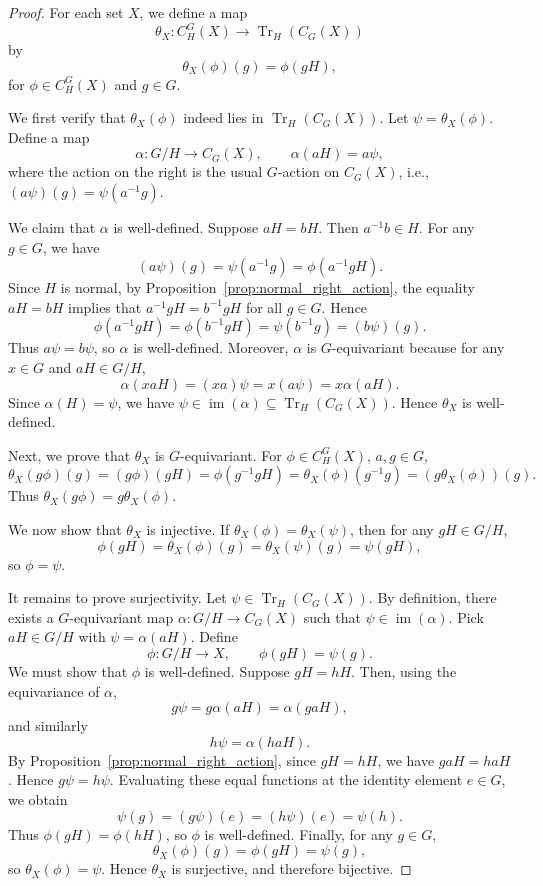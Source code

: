 \documentclass[10pt,a4paper]{amsart}
\begin{document}
\begin{proof}
For each set $X$, we define a map
\[
\theta_X \colon C_H^G(X) \longrightarrow \operatorname{Tr}_H(C_G(X))
\]
by
\[
\theta_X(\phi)(g) = \phi(gH),
\]
for $\phi \in C_H^G(X)$ and $g \in G$.

We first verify that $\theta_X(\phi)$ indeed lies in $\operatorname{Tr}_H(C_G(X))$. Let $\psi = \theta_X(\phi)$. Define a map
\[
\alpha \colon G/H \longrightarrow C_G(X), \qquad \alpha(aH) = a \psi,
\]
where the action on the right is the usual $G$-action on $C_G(X)$, i.e., $(a \psi)(g) = \psi(a^{-1}g)$.

We claim that $\alpha$ is well-defined. Suppose $aH = bH$. Then $a^{-1}b \in H$. For any $g \in G$, we have
\[
(a \psi)(g) = \psi(a^{-1}g) = \phi(a^{-1}gH).
\]
Since $H$ is normal, by Proposition~\ref{prop:normal_right_action}, the equality $aH = bH$ implies that $a^{-1}gH = b^{-1}gH$ for all $g \in G$. Hence
\[
\phi(a^{-1}gH) = \phi(b^{-1}gH) = \psi(b^{-1}g) = (b \psi)(g).
\]
Thus $a \psi = b \psi$, so $\alpha$ is well-defined. Moreover, $\alpha$ is $G$-equivariant because for any $x \in G$ and $aH \in G/H$,
\[
\alpha(xaH) = (xa) \psi = x (a \psi) = x \alpha(aH).
\]
Since $\alpha(H) = \psi$, we have $\psi \in \operatorname{im}(\alpha) \subseteq \operatorname{Tr}_H(C_G(X))$. Hence $\theta_X$ is well-defined.

Next, we prove that $\theta_X$ is $G$-equivariant. For $\phi \in C_H^G(X)$, $a, g \in G$,
\[
\theta_X(g \phi)(g) = (g \phi)(gH) = \phi(g^{-1}gH) = \theta_X(\phi)(g^{-1}g) = (g \theta_X(\phi))(g).
\]
Thus $\theta_X(g \phi) = g \theta_X(\phi)$.

We now show that $\theta_X$ is injective. If $\theta_X(\phi) = \theta_X(\psi)$, then for any $gH \in G/H$,
\[
\phi(gH) = \theta_X(\phi)(g) = \theta_X(\psi)(g) = \psi(gH),
\]
so $\phi = \psi$.

It remains to prove surjectivity. Let $\psi \in \operatorname{Tr}_H(C_G(X))$. By definition, there exists a $G$-equivariant map $\alpha \colon G/H \longrightarrow C_G(X)$ such that $\psi \in \operatorname{im}(\alpha)$. Pick $aH \in G/H$ with $\psi = \alpha(aH)$. Define
\[
\phi \colon G/H \longrightarrow X, \qquad \phi(gH) = \psi(g).
\]
We must show that $\phi$ is well-defined. Suppose $gH = hH$. Then, using the equivariance of $\alpha$,
\[
g \psi = g \alpha(aH) = \alpha(gaH),
\]
and similarly
\[
h \psi = \alpha(haH).
\]
By Proposition~\ref{prop:normal_right_action}, since $gH = hH$, we have $gaH = haH$. Hence $g \psi = h \psi$. Evaluating these equal functions at the identity element $e \in G$, we obtain
\[
\psi(g) = (g \psi)(e) = (h \psi)(e) = \psi(h).
\]
Thus $\phi(gH) = \phi(hH)$, so $\phi$ is well-defined. Finally, for any $g \in G$,
\[
\theta_X(\phi)(g) = \phi(gH) = \psi(g),
\]
so $\theta_X(\phi) = \psi$. Hence $\theta_X$ is surjective, and therefore bijective.


\end{proof}
\end{document}
